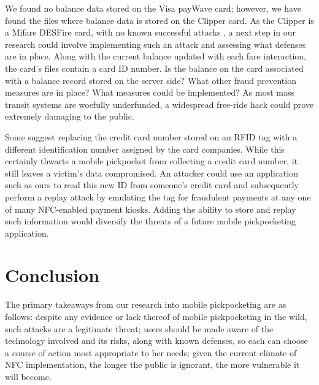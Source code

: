 \documentclass{sig-alternate}
\begin{document}
We found no balance data stored on the Visa payWave card; however, we have found the files where balance data is stored on the Clipper card.  As the Clipper is a Mifare DESFire card, with no known successful attacks \cite{farebot-1}, a next step in our research could involve implementing such an attack and assessing what defenses are in place.  Along with the current balance updated with each fare interaction, the card's files contain a card ID number.  Is the balance on the card associated with a balance record stored on the server side?  What other fraud prevention measures are in place?  What measures could be implemented?  As most mass transit systems are woefully underfunded, a widespread free-ride hack could prove extremely damaging to the public.

Some suggest replacing the credit card number stored on an RFID tag with a different identification number assigned by the card companies. While this certainly thwarts a mobile pickpocket from collecting a credit card number, it still leaves a victim's data compromised. An attacker could use an application such as ours to read this new ID from someone's credit card and subsequently perform a replay attack by emulating the tag for fraudulent payments at any one of many NFC-enabled payment kiosks.  Adding the ability to store and replay such information would diversify the threats of a future mobile pickpocketing application.  

\section{Conclusion}
The primary takeaways from our research into mobile pickpocketing are as follows:  despite any evidence or lack thereof of mobile pickpocketing in the wild, such attacks are a legitimate threat; users should be made aware of the technology involved and its risks, along with known defenses, so each can choose a course of action most appropriate to her needs; given the current climate of NFC implementation, the longer the public is ignorant, the more vulnerable it will become.


%

%
%
\]
\end{document}
